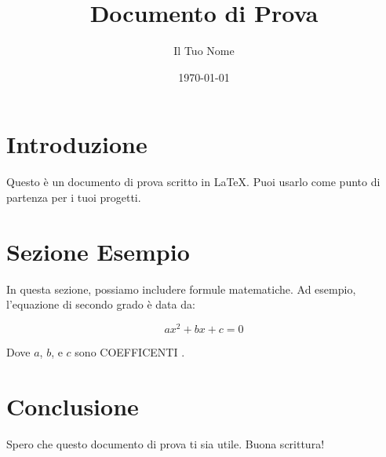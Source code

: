 \documentclass{article}
\title{Documento di Prova}
\author{Il Tuo Nome}
\date{\today}
\begin{document}
\maketitle

\section{Introduzione}
Questo è un documento di prova scritto in \LaTeX. Puoi usarlo come punto di partenza per i tuoi progetti.

\section{Sezione Esempio}
In questa sezione, possiamo includere formule matematiche. Ad esempio, l'equazione di secondo grado è data da:

\[
ax^2 + bx + c = 0
\]


Dove \(a\), \(b\), e \(c\) sono COEFFICENTI .


\section{Conclusione}
Spero che questo documento di prova ti sia utile. Buona scrittura!
\end{document}
